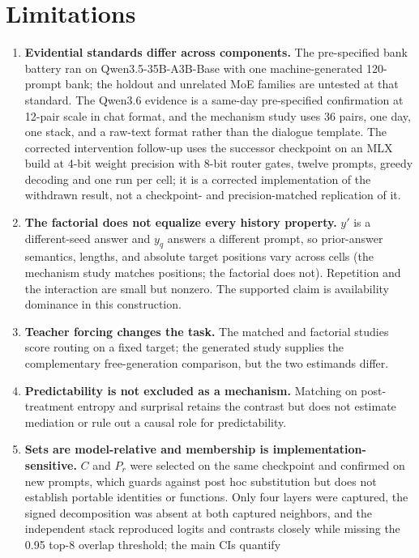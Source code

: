 \documentclass[10pt,a4paper,twocolumn]{article}
\begin{document}
\section{Limitations}\label{sec:limitations}

\begin{enumerate}[leftmargin=1.4em,itemsep=2pt]
\item \textbf{Evidential standards differ across components.} The
pre-specified bank battery ran on Qwen3.5-35B-A3B-Base with one
machine-generated 120-prompt bank; the holdout and unrelated MoE families are
untested at that standard. The Qwen3.6 evidence is a same-day pre-specified
confirmation at 12-pair scale in chat format, and the mechanism study uses 36
pairs, one day, one stack, and a raw-text format rather than the dialogue
template. The corrected intervention follow-up uses the successor checkpoint
on an MLX build at 4-bit weight precision with 8-bit router gates, twelve
prompts, greedy decoding and one run per cell; it is a corrected
implementation of the withdrawn result, not a checkpoint- and
precision-matched replication of it.
\item \textbf{The factorial does not equalize every history property.}
\(y'\) is a different-seed answer and \(y_q\) answers a different prompt, so
prior-answer semantics, lengths, and absolute target positions vary across
cells (the mechanism study matches positions; the factorial does not).
Repetition and the interaction are small but nonzero. The supported claim is
availability dominance in this construction.
\item \textbf{Teacher forcing changes the task.} The matched and factorial
studies score routing on a fixed target; the generated study supplies the
complementary free-generation comparison, but the two estimands differ.
\item \textbf{Predictability is not excluded as a mechanism.} Matching on
post-treatment entropy and surprisal retains the contrast but does not
estimate mediation or rule out a causal role for predictability.
\item \textbf{Sets are model-relative and membership is
implementation-sensitive.} \(C\) and \(P_r\) were selected on the same
checkpoint and confirmed on new prompts, which guards against post hoc
substitution but does not establish portable identities or functions. Only
four layers were captured, the signed decomposition was absent at both
captured neighbors, and the independent stack reproduced logits and contrasts
closely while missing the 0.95 top-8 overlap threshold; the main CIs quantify

\end{enumerate}
\end{document}
